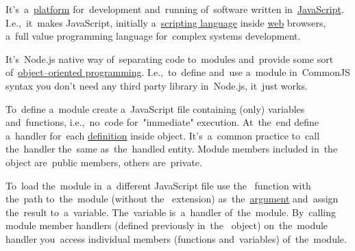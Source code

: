 \label{nodejs}
It's~a~\hyperref[platform]{platform} for~development and~running of~software written in~\hyperref[javascript]{JavaScript}.
I.e.,~it~makes JavaScript, initially a~\hyperref[scriptinglanguages]{scripting language} inside \hyperref[internetweb]{web} browsers, a~full value programming language for~complex systems development.

\label{commonjs}
It's~Node.js native way of~separating code to~modules and~provide some sort of~\hyperref[objectorientedprogramming]{object--oriented programming}.
I.e.,~to~define and~use a~module in~CommonJS syntax you don't need any third party library in~Node.js, it~just works.

To~define a~module create a~JavaScript file containing (only) variables and~functions, i.e.,~no~code for~"immediate" execution.
At~the~end define a~handler for~each \hyperref[declarationdefinition]{definition} inside  object.
It's~a~common practice to~call the~handler the~same as~the~handled entity.
Module members included in~the~ object are~public members, others are~private.

To~load the~module in~a~different JavaScript file use the~ function with the~path to~the~module (without the~ extension) as~the~\hyperref[parameterargument]{argument} and~assign the~result to~a~variable.
The~variable is~a~handler of~the~module.
By~calling module member handlers (defined previously in~the~ object) on~the~module handler you~access individual members (functions and~variables) of~the~module.

